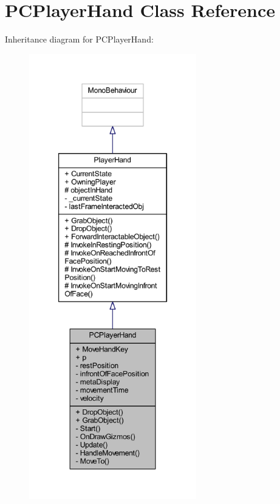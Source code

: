 \hypertarget{class_p_c_player_hand}{}\section{P\+C\+Player\+Hand Class Reference}
\label{class_p_c_player_hand}


Inheritance diagram for P\+C\+Player\+Hand\+:
\nopagebreak
\begin{figure}[H]
\begin{center}
\leavevmode
\includegraphics[height=550pt]{class_p_c_player_hand__inherit__graph}
\end{center}
\end{figure}


